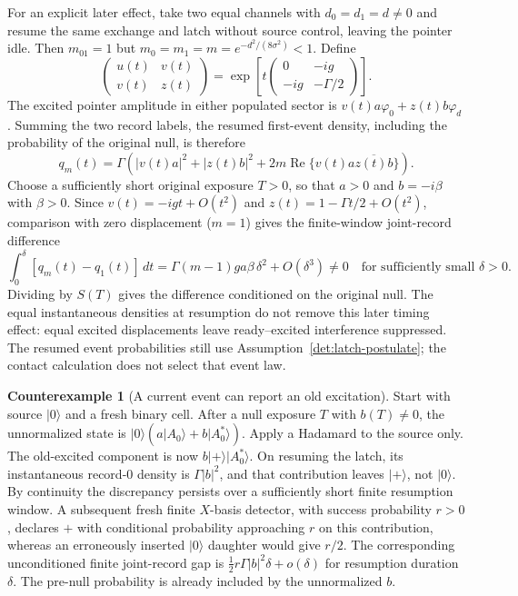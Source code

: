 \documentclass[11pt,oneside,openany]{book}
\theoremstyle{definition}
\newtheorem{counterexample}[theorem]{Counterexample}
\theoremstyle{remark}\newtheorem{remark}[theorem]{Remark}
\begin{document}
For an explicit later effect, take two equal channels with
$d_0=d_1=d\ne0$ and resume the same exchange and latch without
source control, leaving the pointer idle. Then $m_{01}=1$ but
$m_0=m_1=m=e^{-d^2/(8\sigma^2)}<1$. Define
\[
 \begin{pmatrix}u(t)&v(t)\\v(t)&z(t)\end{pmatrix}
 =\exp\left[t\begin{pmatrix}0&-ig\\-ig&-\Gamma/2\end{pmatrix}\right].
\]
The excited pointer amplitude in either populated sector is
$v(t)a\varphi_0+z(t)b\varphi_d$. Summing the two record labels,
the resumed first-event density, including the probability of the
original null, is therefore
\begin{equation}
 q_m(t)=\Gamma\left(|v(t)a|^2+|z(t)b|^2
       +2m\operatorname{Re}\{v(t)a\overline{z(t)b}\}\right).
 \label{det:pointer-resumed-density}
\end{equation}
Choose a sufficiently short original exposure $T>0$, so that
$a>0$ and $b=-i\beta$ with $\beta>0$. Since
$v(t)=-igt+O(t^2)$ and $z(t)=1-\Gamma t/2+O(t^2)$,
comparison with zero displacement ($m=1$) gives the finite-window
joint-record difference
\begin{equation}
 \int_0^\delta[q_m(t)-q_1(t)]\,dt
 =\Gamma(m-1)ga\beta\,\delta^2+O(\delta^3)\ne0
 \quad\text{for sufficiently small }\delta>0.
 \label{det:pointer-timing-gap}
\end{equation}
Dividing by $S(T)$ gives the difference conditioned on the original
null. The equal instantaneous densities at resumption do not remove
this later timing effect: equal excited displacements leave
ready--excited interference suppressed. The resumed event probabilities
still use Assumption~\ref{det:latch-postulate}; the contact calculation
does not select that event law.

\begin{counterexample}[A current event can report an old excitation]
\label{det:stale}
Start with source $|0\rangle$ and a fresh binary cell. After a null
exposure $T$ with $b(T)\ne0$, the unnormalized state is
$|0\rangle(a|A_0\rangle+b|A_0^*\rangle)$. Apply a Hadamard to the
source only. The old-excited component is now
$b|+\rangle|A_0^*\rangle$. On resuming the latch, its instantaneous
record-$0$ density is $\Gamma|b|^2$, and that contribution leaves
$|+\rangle$, not $|0\rangle$. By continuity the discrepancy persists
over a sufficiently short finite resumption window. A subsequent fresh
finite $X$-basis detector, with success probability $r>0$, declares
$+$ with conditional probability approaching $r$ on this contribution,
whereas an erroneously inserted $|0\rangle$ daughter would give
$r/2$. The corresponding unconditioned finite joint-record gap is
$\tfrac12r\Gamma|b|^2\delta+o(\delta)$ for resumption duration
$\delta$. The pre-null probability is already included by the
unnormalized $b$.
\end{counterexample}
\end{document}
